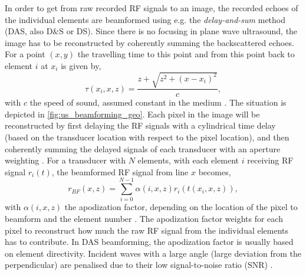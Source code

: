 In order to get from raw recorded RF signals to an image, the recorded echoes of the individual elements are beamformed using e.g. the \textit{delay-and-sum} method (DAS, also D\&S or DS). Since there is no focusing in plane wave ultrasound, the image has to be reconstructed by coherently summing the backscattered echoes. For a point $(x,y)$ the travelling time to this point and from this point back to element $i$ at $x_i$ is given by,
\begin{equation}
    \tau \left( x_i, x, z \right) = \frac{z + \sqrt{z^2 + {\left( x- x_i \right)}^2 }}{c},
\end{equation}
with $c$ the speed of sound, assumed constant in the medium \cite{montaldo_coherent_2009}. The situation is depicted in \autoref{fig:us_beamforming_geo}. Each pixel in the image will be reconstructed by first delaying the RF signals with a cylindrical time delay (based on the transducer location with respect to the pixel location), and then coherently summing the delayed signals of each transducer with an aperture weighting \cite{tanter_ultrafast_2002}. For a transducer with $N$ elements, with each element $i$ receiving RF signal $r_i(t)$, the beamformed RF signal from line $x$ becomes, 
\begin{equation}
    r_{BF} \left( x, z\right) = \sum_{i=0}^{N-1} \alpha\left(i,x,z \right) r_i \left(  t \left( x_i, x, z \right) \right),
\end{equation}
with $\alpha(i,x,z)$ the apodization factor, depending on the location of the pixel to beamform and the element number \cite{holfort_broadband_2009}. The apodization factor weights for each pixel to reconstruct how much the raw RF signal from the individual elements has to contribute. In DAS beamforming, the apodization factor is usually based on element directivity. Incident waves with a large angle (large deviation from the perpendicular) are penalised due to their low signal-to-noise ratio (SNR) \cite{chen_improved_2018}. %

